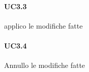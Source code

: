 	\paragraph{UC3.3}
	applico le modifiche fatte
	
	\paragraph{UC3.4}
	Annullo le modifiche fatte
\iffalse %
\paragraph{UC3.2}
aggiornamento delle preferenze
\subparagraph{UC1.2.1}
modifica calendario:
dato il calendario lavorativo l'utente modifica i giorni disponibili
\subparagraph{UC1.2.2}
cambio piattaforma di messaggistica
telegram: modifica nickname
slack: modifica nickname
mail: modifica email
\fi
		
		
		
		
